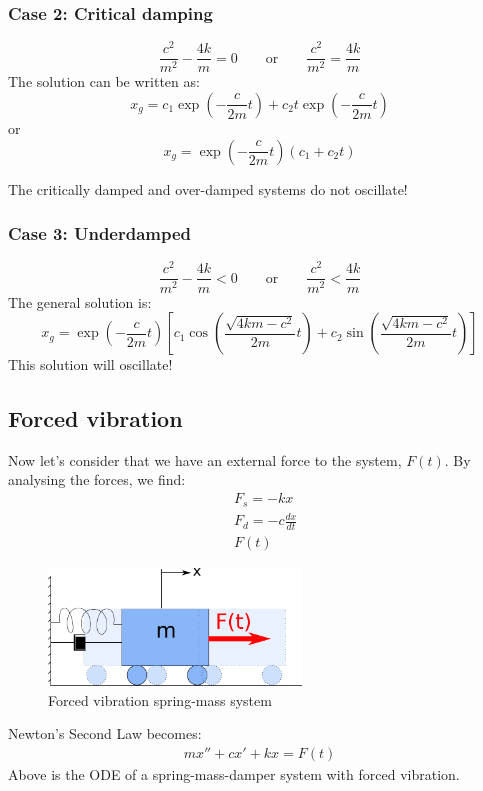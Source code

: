 \begin{enumerate}
\subsubsection{Case 2: Critical damping}
\begin{equation*}
\frac{c^2}{m^2}-\frac{4k}{m}=0 \qquad \text{or} \qquad \frac{c^2}{m^2}=\frac{4k}{m}
\end{equation*}
The solution can be written as:
\begin{equation*}
x_g= c_1\exp\left(-\frac{c}{2m} t\right)+c_2 t \exp\left(-\frac{c}{2m} t\right)
\end{equation*}
or 
\begin{equation*}
\boxed{x_g= \exp\left(-\frac{c}{2m} t\right)\left(c_1+c_2 t\right)}
\end{equation*}

The critically damped and over-damped systems do not oscillate!



\subsubsection{Case 3: Underdamped}
\begin{equation*}
\frac{c^2}{m^2}-\frac{4k}{m}<0 \qquad \text{or} \qquad \frac{c^2}{m^2}<\frac{4k}{m}
\end{equation*}
The general solution is:
\begin{equation*}
\boxed{x_g = \exp\left(-\frac{c}{2m} t\right)\left[c_1\cos\left(\frac{\sqrt{4km-c^2}}{2m}t\right) +c_2\sin\left(\frac{\sqrt{4km-c^2}}{2m}t\right)\right]}
\end{equation*}
This solution will oscillate!

\end{enumerate}

\subsection{Forced vibration}
Now let's consider that we have an external force to the system, $F(t)$. By analysing the forces, we find:
\begin{align*}
&F_s = -kx\\
&F_d = -c \frac{dx}{dt}\\
&F(t) 
\end{align*}
\begin{figure}
\centering
\includegraphics[width=0.6\textwidth]{figs/massSpringDamperForcedSystem.pdf} 
\caption{Forced vibration spring-mass system}
\end{figure}

 Newton's Second Law becomes:
 \begin{align*}
\boxed{mx''+cx' +kx = F(t)}
\end{align*}
Above is the ODE of a spring-mass-damper system with forced vibration.

\updateinfo[November 5, 2018]